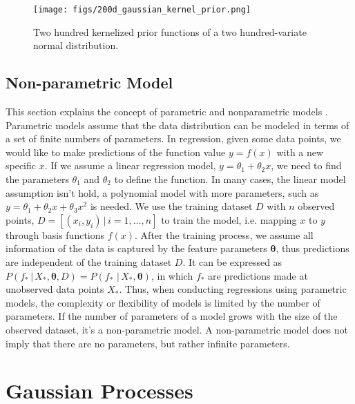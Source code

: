 \documentclass[preprint,12pt]{elsarticle}
\begin{document}
\begin{figure}[h!]
	\centering
		\texttt{[image: figs/200d\_gaussian\_kernel\_prior.png]}
	\caption{Two hundred kernelized prior functions of a two hundred-variate normal distribution.}
	\label{FIG:8}
\end{figure}

\subsection{Non-parametric Model}

This section explains the concept of parametric and nonparametric models \cite{Murphy2012}. Parametric models assume that the data distribution can be modeled in terms of a set of finite numbers of parameters. In regression, given some data points, we would like to make predictions of the function value $y=f(x)$ with a new specific $x$. If we assume a linear regression model, $y = \theta_1  + \theta_2 x$, we need to find the parameters $\theta_1$ and $\theta_2$ to define the function. In many cases, the linear model assumption isn’t hold, a polynomial model with more parameters, such as $y = \theta_1+\theta_2 x+\theta_3 x^2$ is needed. We use the training dataset $D$ with $n$ observed points, $D=[(x_i,y_i)\, \vert \, i=1, \ldots, n]$ to train the model, i.e. mapping $x$ to $y$ through basis functions $f(x)$. After the training process, we assume all information of the data is captured by the feature parameters $\mathbf{\theta}$, thus predictions are independent of the training dataset $D$. It can be expressed as $P(f_* \, \vert \,  X_*, \mathbf {\theta} ,D)=P(f_* \, \, \vert \,  X_*, \mathbf {\theta})$, in which $f_*$ are predictions made at unobserved data points $X_*$. Thus, when conducting regressions using parametric models, the complexity or flexibility of models is limited by the number of parameters. If the number of parameters of a model grows with the size of the observed dataset, it’s a non-parametric model. A non-parametric model does not imply that there are no parameters, but rather infinite parameters. 

\section{Gaussian Processes}
\end{document}
